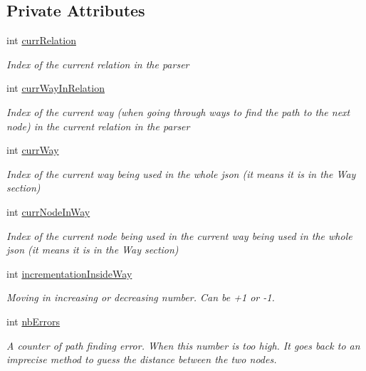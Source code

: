 \subsection*{Private Attributes}
\begin{DoxyCompactItemize}
\item 
int \hyperlink{classCompleteDistBetweenNodes_a59b1019044d1b1356aed96518d966b67}{curr\+Relation}
\begin{DoxyCompactList}\small\item\em Index of the current relation in the parser\end{DoxyCompactList}\item 
int \hyperlink{classCompleteDistBetweenNodes_a46dbf828cd8b746676196eaabde6304b}{curr\+Way\+In\+Relation}
\begin{DoxyCompactList}\small\item\em Index of the current way (when going through ways to find the path to the next node) in the current relation in the parser\end{DoxyCompactList}\item 
int \hyperlink{classCompleteDistBetweenNodes_a40d2705ba67f2f14522b48375e2eed6f}{curr\+Way}
\begin{DoxyCompactList}\small\item\em Index of the current way being used in the whole json (it means it is in the \textquotesingle{}Way\textquotesingle{} section)\end{DoxyCompactList}\item 
int \hyperlink{classCompleteDistBetweenNodes_a95b430cff498d73f175ef7e007039396}{curr\+Node\+In\+Way}
\begin{DoxyCompactList}\small\item\em Index of the current node being used in the current way being used in the whole json (it means it is in the \textquotesingle{}Way\textquotesingle{} section)\end{DoxyCompactList}\item 
int \hyperlink{classCompleteDistBetweenNodes_aa66cef66c958e33d28f865ce35655577}{incrementation\+Inside\+Way}
\begin{DoxyCompactList}\small\item\em Moving in increasing or decreasing number. Can be +1 or -\/1.\end{DoxyCompactList}\item 
int \hyperlink{classCompleteDistBetweenNodes_a80e870620f7bec4a390dbead18927cd2}{nb\+Errors}
\begin{DoxyCompactList}\small\item\em A counter of path finding error. When this number is too high. It goes back to an imprecise method to guess the distance between the two nodes.\end{DoxyCompactList}\item 

\end{DoxyCompactItemize}
